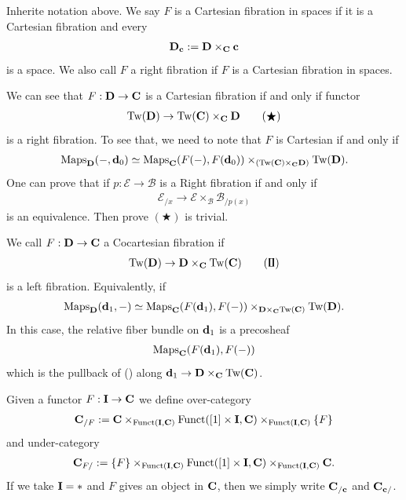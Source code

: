 {\np Inherite notation above. We say $F$ is a Cartesian fibration in spaces if it is a Cartesian fibration and every 
\begin{align*}
    \textbf{D}_{\textbf{c}}:= \textbf{D}\times_{\textbf{C}} \textbf{c}
\end{align*}
is a space. We also call $F$ a right fibration if $F$ is a Cartesian fibration in spaces.

\np We can see that $F:\textbf{D}\to\textbf{C}$ is a Cartesian fibration if and only if functor 
\begin{align*}
    \text{Tw}(\textbf{D}) \to \text{Tw}(\textbf{C})\times_{\textbf{C}}\textbf{D} \tag{$\bigstar$}
\end{align*}
is a right fibration. To see that, we need to note that $F$ is Cartesian if and only if 
\begin{align*}
    \operatorname{Maps}_{\textbf{D}}(-,\textbf{d}_0)\simeq \operatorname{Maps}_{\textbf{C}}(F(-),F(\textbf{d}_0))\times_{(\text{Tw}(\textbf{C})\times_{\textbf{C}}\textbf{D})} \text{Tw}(\textbf{D}).
\end{align*}
One can prove that if $p:\mathcal{E}\to \mathcal{B}$ is a Right fibration if and only if
\begin{align*}
    \mathcal{E}_{/x} \longrightarrow \mathcal{E} \times_{\mathcal{B}} \mathcal{B}_{/p(x)}
\end{align*}
is an equivalence.
Then prove $(\bigstar)$ is trivial.

\np We call $F:\textbf{D}\to\textbf{C}$ a Cocartesian fibration if 
\begin{align*}
    \text{Tw}(\textbf{D}) \to \textbf{D}\times_{\textbf{C}}\text{Tw}(\textbf{C}) \tag{\Gemini}
\end{align*}
is a left fibration. Equivalently, if 
\begin{align*}
    \operatorname{Maps}_{\textbf{D}}(\textbf{d}_1,-)\simeq \operatorname{Maps}_{\textbf{C}}(F(\textbf{d}_1),F(-))\times_{\textbf{D}\times_{\textbf{C}}\text{Tw}(\textbf{C})} \text{Tw}(\textbf{D}).
\end{align*}
In this case, the relative fiber bundle on $\textbf{d}_1$ is a precosheaf 
\begin{align*}
    \operatorname{Maps}_{\textbf{C}}(F(\textbf{d}_1),F(-))
\end{align*}
which is the pullback of (\Gemini) along $\textbf{d}_1\to \textbf{D}\times_{\textbf{C}}\text{Tw}(\textbf{C})$.

\np Given a functor $F:\textbf{I}\to\textbf{C}$ we define over-category 
\begin{align*}
    \textbf{C}_{/F}:= \textbf{C}\times_{\operatorname{Funct}(\textbf{I},\textbf{C})}\operatorname{Funct}([1]\times\textbf{I},\textbf{C})\times_{\operatorname{Funct}(\textbf{I},\textbf{C})} \{F\}
\end{align*}
and under-category
\begin{align*}
    \textbf{C}_{F/}:=\{F\} \times_{\operatorname{Funct}(\textbf{I},\textbf{C})}\operatorname{Funct}([1]\times\textbf{I},\textbf{C})\times_{\operatorname{Funct}(\textbf{I},\textbf{C})} \textbf{C}.
\end{align*}
If we take $\textbf{I}=*$ and $F$ gives an object in $\textbf{C}$, then we simply write $\textbf{C}_{/\textbf{c}}$ and $\textbf{C}_{\textbf{c}/}$.

}
